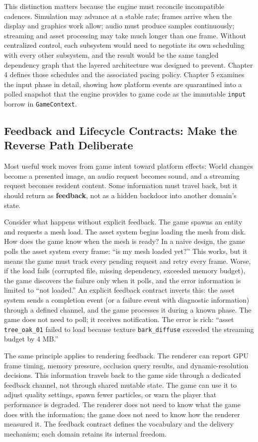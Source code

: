 \documentclass[
  11pt,
  letterpaper,
  DIV=11,
  numbers=noendperiod,
  twoside,
  open=right]{scrreprt}
\begin{document}
This distinction matters because the engine must reconcile incompatible
cadences. Simulation may advance at a stable rate; frames arrive when
the display and graphics work allow; audio must produce samples
continuously; streaming and asset processing may take much longer than
one frame. Without centralized control, each subsystem would need to
negotiate its own scheduling with every other subsystem, and the result
would be the same tangled dependency graph that the layered architecture
was designed to prevent. Chapter 4 defines those schedules and the
associated pacing policy. Chapter 5 examines the input phase in detail,
showing how platform events are quarantined into a polled snapshot that
the engine provides to game code as the immutable \texttt{input} borrow
in \texttt{GameContext}.

\subsection{Feedback and Lifecycle Contracts: Make the Reverse Path
Deliberate}\label{feedback-and-lifecycle-contracts-make-the-reverse-path-deliberate}

Most useful work moves from game intent toward platform effects: World
changes become a presented image, an audio request becomes sound, and a
streaming request becomes resident content. Some information must travel
back, but it should return as \textbf{feedback}, not as a hidden
backdoor into another domain's state.

Consider what happens without explicit feedback. The game spawns an
entity and requests a mesh load. The asset system begins loading the
mesh from disk. How does the game know when the mesh is ready? In a
naive design, the game polls the asset system every frame: ``is my mesh
loaded yet?'' This works, but it means the game must track every pending
request and retry every frame. Worse, if the load fails (corrupted file,
missing dependency, exceeded memory budget), the game discovers the
failure only when it polls, and the error information is limited to
``not loaded.'' An explicit feedback contract inverts this: the asset
system sends a completion event (or a failure event with diagnostic
information) through a defined channel, and the game processes it during
a known phase. The game does not need to poll; it receives notification.
The error is rich: ``asset \texttt{tree\_oak\_01} failed to load because
texture \texttt{bark\_diffuse} exceeded the streaming budget by 4 MB.''

The same principle applies to rendering feedback. The renderer can
report GPU frame timing, memory pressure, occlusion query results, and
dynamic-resolution decisions. This information travels back to the game
side through a dedicated feedback channel, not through shared mutable
state. The game can use it to adjust quality settings, spawn fewer
particles, or warn the player that performance is degraded. The renderer
does not need to know what the game does with the information; the game
does not need to know how the renderer measured it. The feedback
contract defines the vocabulary and the delivery mechanism; each domain
retains its internal freedom.
\end{document}
